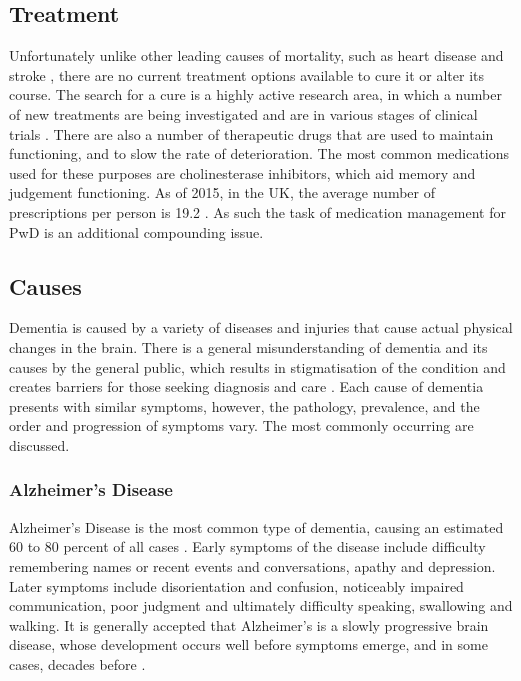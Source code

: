 \subsection{Treatment}
Unfortunately unlike other leading causes of mortality, such as heart disease and stroke \cite{WorldHealthOrganisation2015}, there are no current treatment options available to cure it or alter its course.
The search for a cure is a highly active research area, in which a number of new treatments are being investigated and are in various stages of clinical trials \cite{Burke2015}. There are also a number of therapeutic drugs that are used to maintain functioning, and to slow the rate of deterioration. The most common medications used for these purposes are cholinesterase inhibitors, which aid memory and judgement functioning. As of 2015, in the UK, the average number of prescriptions per person is 19.2 \cite{TheAssociationoftheBritishPharmaceuticalIndustry}. As such the task of medication management for PwD is an additional compounding issue.

\subsection{Causes}
Dementia is caused by a variety of diseases and injuries that cause actual physical changes in the brain. There is a general misunderstanding of dementia and its causes by the general public, which results in stigmatisation of the condition and creates barriers for those seeking diagnosis and care \cite{WHODementia2015}.
Each cause of dementia presents with similar symptoms, however, the pathology, prevalence, and the order and progression of symptoms vary. The most commonly occurring are discussed.

\subsubsection{Alzheimer's Disease}
Alzheimer's Disease is the most common type of dementia, causing an estimated 60 to 80 percent of all cases \cite{2015AlzheimersDiseaseFactsFigures}.
Early symptoms of the disease include difficulty remembering names or recent events and conversations, apathy and depression. Later symptoms include disorientation and confusion, noticeably impaired communication, poor judgment and ultimately difficulty speaking, swallowing and walking.
It is generally accepted that Alzheimer’s is a slowly progressive brain disease, whose development occurs well before symptoms emerge, and in some cases, decades before \cite{DelaTorre2012, 2015AlzheimersDiseaseFactsFigures}.

